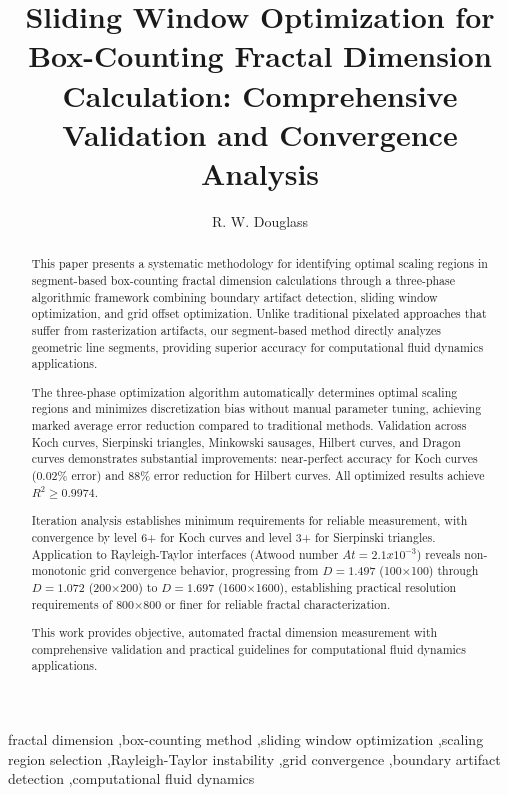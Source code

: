 \documentclass[preprint,12pt]{elsarticle}
\def\times{x}%
\begin{document}
\begin{frontmatter}

\title{Sliding Window Optimization for Box-Counting Fractal Dimension Calculation: Comprehensive Validation and Convergence Analysis}

\author{R. W. Douglass}



\begin{abstract}
This paper presents a systematic methodology for identifying optimal scaling regions in segment-based box-counting fractal dimension calculations through a three-phase algorithmic framework combining boundary artifact detection, sliding window optimization, and grid offset optimization. Unlike traditional pixelated approaches that suffer from rasterization artifacts, our segment-based method directly analyzes geometric line segments, providing superior accuracy for computational fluid dynamics applications.

The three-phase optimization algorithm automatically determines optimal scaling regions and minimizes discretization bias without manual parameter tuning, achieving marked average error reduction compared to traditional methods. Validation across Koch curves, Sierpinski triangles, Minkowski sausages, Hilbert curves, and Dragon curves demonstrates substantial improvements: near-perfect accuracy for Koch curves (0.02\% error) and 88\% error reduction for Hilbert curves. All optimized results achieve $R^2 \geq 0.9974$.

Iteration analysis establishes minimum requirements for reliable measurement, with convergence by level 6+ for Koch curves and level 3+ for Sierpinski triangles. Application to Rayleigh-Taylor interfaces (Atwood number $At = 2.1 \times 10^{-3}$) reveals non-monotonic grid convergence behavior, progressing from $D = 1.497$ (100×100) through $D = 1.072$ (200×200) to $D = 1.697$ (1600×1600), establishing practical resolution requirements of 800×800 or finer for reliable fractal characterization.

This work provides objective, automated fractal dimension measurement with comprehensive validation and practical guidelines for computational fluid dynamics applications.
\end{abstract}

\begin{keyword}
fractal dimension \sep box-counting method \sep sliding window optimization \sep scaling region selection \sep Rayleigh-Taylor instability \sep grid convergence \sep boundary artifact detection \sep computational fluid dynamics
\end{keyword}

\end{frontmatter}
\end{document}
